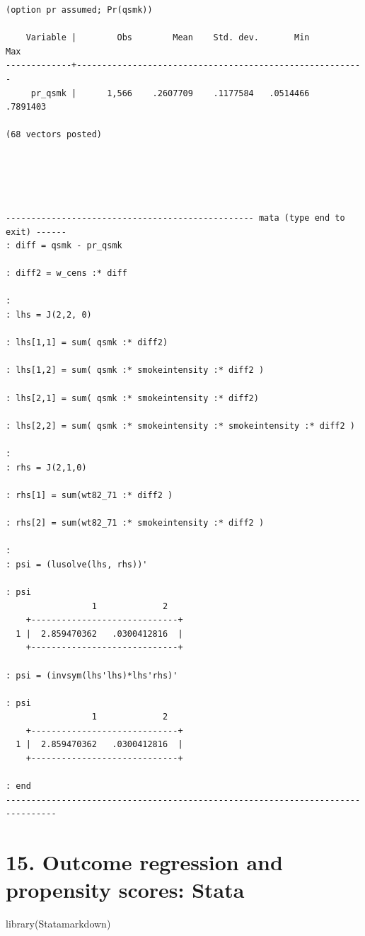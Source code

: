 \documentclass[
  10pt,
]{book}
\newenvironment{Shaded}{\begin{snugshade}}{\end{snugshade}}
\newcommand{\FunctionTok}[1]{\textcolor[rgb]{0.00,0.00,0.00}{#1}}
\newcommand{\NormalTok}[1]{#1}
\begin{document}
\begin{verbatim}
(option pr assumed; Pr(qsmk))

    Variable |        Obs        Mean    Std. dev.       Min        Max
-------------+---------------------------------------------------------
     pr_qsmk |      1,566    .2607709    .1177584   .0514466   .7891403

(68 vectors posted)





------------------------------------------------- mata (type end to exit) ------
: diff = qsmk - pr_qsmk

: diff2 = w_cens :* diff

: 
: lhs = J(2,2, 0)

: lhs[1,1] = sum( qsmk :* diff2)

: lhs[1,2] = sum( qsmk :* smokeintensity :* diff2 )

: lhs[2,1] = sum( qsmk :* smokeintensity :* diff2)

: lhs[2,2] = sum( qsmk :* smokeintensity :* smokeintensity :* diff2 )

:                                                                 
: rhs = J(2,1,0)

: rhs[1] = sum(wt82_71 :* diff2 )

: rhs[2] = sum(wt82_71 :* smokeintensity :* diff2 )

: 
: psi = (lusolve(lhs, rhs))'

: psi
                 1             2
    +-----------------------------+
  1 |  2.859470362   .0300412816  |
    +-----------------------------+

: psi = (invsym(lhs'lhs)*lhs'rhs)'

: psi
                 1             2
    +-----------------------------+
  1 |  2.859470362   .0300412816  |
    +-----------------------------+

: end
--------------------------------------------------------------------------------
\end{verbatim}

\hypertarget{outcome-regression-and-propensity-scores-stata}{%
\chapter*{15. Outcome regression and propensity scores: Stata}\label{outcome-regression-and-propensity-scores-stata}}

\begin{Shaded}
\begin{Highlighting}[]
\FunctionTok{library}\NormalTok{(Statamarkdown)}
\end{Highlighting}
\end{Shaded}
\end{document}
